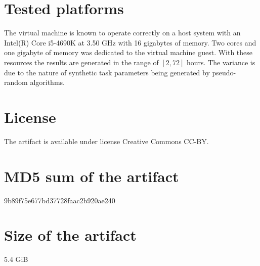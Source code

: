 \documentclass[a4paper,USenglish,english]{darts-v2018}
\newenvironment{platforms}{\section{Tested platforms}}{}
\newcommand{\license}[1]{{\section{License}#1}}
\newcommand{\mdsum}[1]{{\section{MD5 sum of the artifact}#1}}
\newcommand{\artifactsize}[1]{{\section{Size of the artifact}#1}}
\begin{document}
\begin{platforms}
  The virtual machine is known to operate correctly on a host system
  with an Intel(R) Core i5-4690K at 3.50 GHz with 16 gigabytes of
  memory. Two cores and one gigabyte of memory was dedicated to the
  virtual machine guest. With these resources the results are generated in the
  range of ${[2, 72]}$ hours. The variance is due to the nature of synthetic task
  parameters being generated by pseudo-random algorithms.
\end{platforms}

\license{The artifact is available under license Creative Commons CC-BY.}

\mdsum{9b89f75e677bd37728faac2b920ae240}

\artifactsize{5.4 GiB}
\end{document}
